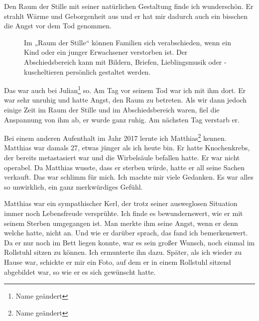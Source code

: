 \documentclass[fontsize=14pt,a4paper,headinclude,DIV=calc,automark]{scrbook}
\begin{document}
Den Raum der Stille mit seiner natürlichen Gestaltung finde ich wunderschön. Er strahlt Wärme und Geborgenheit aus und er hat mir dadurch auch ein bisschen die Angst vor dem Tod genommen.

\setlength{\fboxsep}{0pt}    %
\setlength{\fboxrule}{0.2pt} %
\begin{figure}[H]
    \centering
    \caption{Im „Raum der Stille“ können Familien sich verabschieden, wenn ein Kind oder ein junger Erwachsener verstorben ist. Der Abschiedsbereich kann mit Bildern, Briefen, Lieblingsmusik oder -kuscheltieren persönlich gestaltet werden.}
    \label{fig:raum_der_stille}
\end{figure}

Das war auch bei Julian\footnote{Name geändert} so. Am Tag vor seinem Tod war ich mit ihm dort. Er war sehr unruhig und hatte Angst, den Raum zu betreten. Als wir dann jedoch einige Zeit im Raum der Stille und im Abschiedsbereich waren, fiel die Anspannung von ihm ab, er wurde ganz ruhig. Am nächsten Tag verstarb er.

Bei einem anderen Aufenthalt im Jahr 2017 lernte ich Matthias\footnote{Name geändert} kennen. Matthias war damals 27, etwas jünger als ich heute bin. Er hatte Knochenkrebs, der bereits metastasiert war und die Wirbelsäule befallen hatte. Er war nicht operabel. Da Matthias wusste, dass er sterben würde, hatte er all seine Sachen verkauft. Das war schlimm für mich. Ich machte mir viele Gedanken. Es war alles so unwirklich, ein ganz merkwürdiges Gefühl.

Matthias war ein sympathischer Kerl, der trotz seiner ausweglosen Situation immer noch Lebensfreude versprühte. Ich finde es bewundernswert, wie er mit seinem Sterben umgegangen ist. Man merkte ihm seine Angst, wenn er denn welche hatte, nicht an. Und wie er darüber sprach, das fand ich bemerkenswert. Da er nur noch im Bett liegen konnte, war es sein großer Wunsch, noch einmal im Rollstuhl sitzen zu können. Ich ermunterte ihn dazu. Später, als ich wieder zu Hause war, schickte er mir ein Foto, auf dem er in einem Rollstuhl sitzend abgebildet war, so wie er es sich gewünscht hatte.
\end{document}
